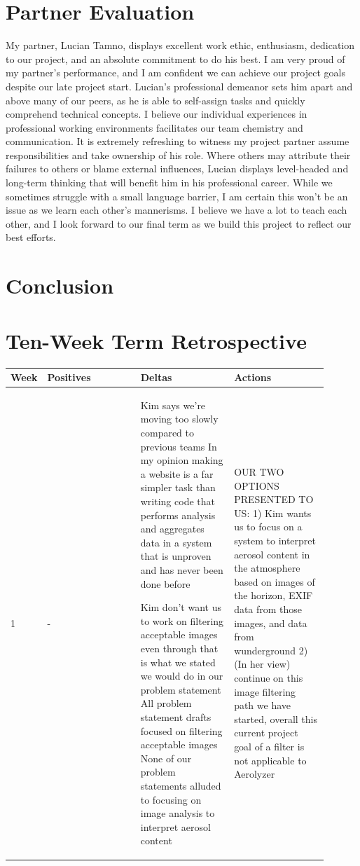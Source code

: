 \documentclass[onecolumn, draftclsnofoot,10pt, compsoc]{IEEEtran}
\begin{document}
\begin{singlespace}
	\section{Partner Evaluation}
		My partner, Lucian Tamno, displays excellent work ethic, enthusiasm, dedication to our project, and an absolute commitment to do his best.
		I am very proud of my partner's performance, and I am confident we can achieve our project goals despite our late project start.
		Lucian's professional demeanor sets him apart and above many of our peers, as he is able to self-assign tasks and quickly comprehend technical concepts.
		I believe our individual experiences in professional working environments facilitates our team chemistry and communication.
		It is extremely refreshing to witness my project partner assume responsibilities and take ownership of his role.
		Where others may attribute their failures to others or blame external influences, Lucian displays level-headed and long-term thinking that will benefit him in his professional career.
		While we sometimes struggle with a small language barrier, I am certain this won't be an issue as we learn each other's mannerisms.
		I believe we have a lot to teach each other, and I look forward to our final term as we build this project to reflect our best efforts.

	\section{Conclusion}
	

	\clearpage

	\section{Ten-Week Term Retrospective}
		\begin{longtable}{|l|p{0.3\linewidth}|p{0.3\linewidth}|p{0.3\linewidth}|}\hline \textbf{Week} & \textbf{Positives} & \textbf{Deltas} & \textbf{Actions}\\\hline
		1 	&
			-
			&
				Kim says we're moving too slowly compared to previous teams
				In my opinion making a website is a far simpler task than writing code that performs analysis  and aggregates data in a system that is unproven and has never been done before

				Kim don't want us to work on filtering acceptable images even through that is what we stated we would do in our problem statement
				All problem statement drafts focused on filtering acceptable images
				None of our problem statements alluded to focusing on image analysis to interpret aerosol content
			&
				OUR TWO OPTIONS PRESENTED TO US:
				1) Kim wants us to focus on a system to interpret aerosol content in the atmosphere based on images of the horizon, EXIF data from those images, and data from wunderground
				2) (In her view) continue on this image filtering path we have started, overall this current project goal of a filter is not applicable to Aerolyzer


\end{longtable}
\end{singlespace}
\end{document}
